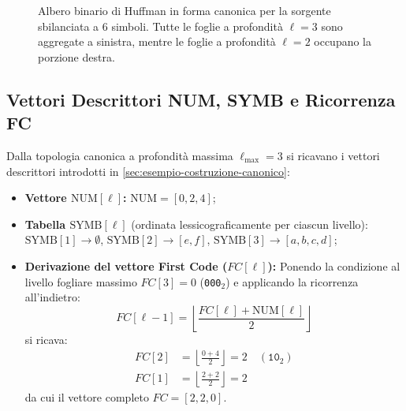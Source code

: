 \begin{figure}[H]
\caption{Albero binario di Huffman in forma canonica per la sorgente sbilanciata a 6 simboli. Tutte le foglie a profondit\`a $\ell = 3$ sono aggregate a sinistra, mentre le foglie a profondit\`a $\ell = 2$ occupano la porzione destra.}
\label{fig:albero-huffman-canonico-sbilanciato}
\end{figure}

\FloatBarrier
\subsection{Vettori Descrittori NUM, SYMB e Ricorrenza FC}
\label{subsec:vettori-fc-sbilanciato}

Dalla topologia canonica a profondit\`a massima $\ell_{\max} = 3$ si ricavano i vettori descrittori introdotti in \autoref{sec:esempio-costruzione-canonico}:
\begin{itemize}
  \item \textbf{Vettore $\text{NUM}[\ell]$:} $\text{NUM} = [0, 2, 4]$;
  \item \textbf{Tabella $\text{SYMB}[\ell]$} (ordinata lessicograficamente per ciascun livello): $\text{SYMB}[1] \to \emptyset$, $\text{SYMB}[2] \to [e, f]$, $\text{SYMB}[3] \to [a, b, c, d]$;
  \item \textbf{Derivazione del vettore First Code ($FC[\ell]$):} Ponendo la condizione al livello fogliare massimo $FC[3] = 0$ (\texttt{000}$_2$) e applicando la ricorrenza all'indietro:
  \begin{equation}
    FC[\ell - 1] = \left\lfloor \frac{FC[\ell] + \text{NUM}[\ell]}{2} \right\rfloor
  \end{equation}
  si ricava:
  \begin{align}
    FC[2] &= \left\lfloor \frac{0 + 4}{2} \right\rfloor = 2 \quad (\texttt{10}_2) \\
    FC[1] &= \left\lfloor \frac{2 + 2}{2} \right\rfloor = 2
  \end{align}
  da cui il vettore completo $FC = [2, 2, 0]$.
\end{itemize}

